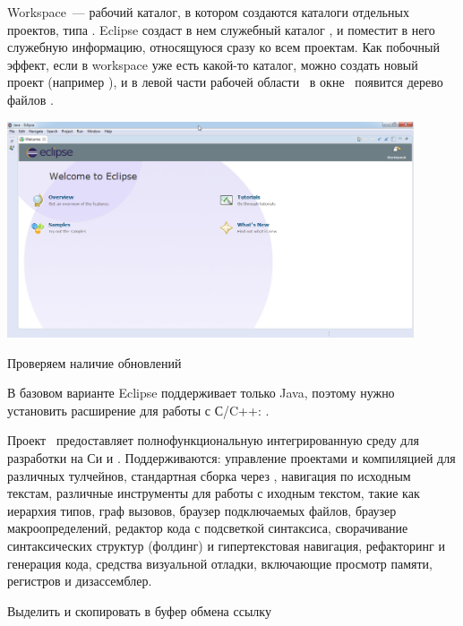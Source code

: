 \bigskip Workspace\ --- рабочий каталог, в котором создаются каталоги отдельных
проектов, типа . Eclipse создаст в нем служебный каталог
, и поместит в него служебную информацию, относящуюся сразу ко
всем проектам. Как побочный эффект, если в workspace уже есть какой-то каталог,
можно создать новый проект (например ), и в левой части рабочей
области \eclipse\ в окне \ появится дерево файлов
.

\bigskip{}

\bigskip\includegraphics[width=0.9\textwidth]{fig/EclipseMain.png}

\bigskip Проверяем наличие обновлений

\bigskip{}

\bigskip В базовом варианте Eclipse поддерживает только Java, поэтому нужно
установить расширение для работы с С/C++: .

\bigskip
Проект \ предоставляет полнофункциональную интегрированную среду
для разработки на Си и \cpp. Поддерживаются: управление проектами и
компиляцией для различных тулчейнов, стандартная сборка через
, навигация по исходным текстам, различные инструменты для
работы с иходным текстом, такие как иерархия типов, граф вызовов, браузер
подключаемых файлов, браузер макроопределений, редактор кода с подсветкой
синтаксиса, сворачивание синтаксических структур (фолдинг) и гипертекстовая
навигация, рефакторинг и генерация кода, средства визуальной отладки,
включающие просмотр памяти, регистров и дизассемблер.

\bigskip{}

\bigskip Выделить и скопировать в буфер обмена ссылку

